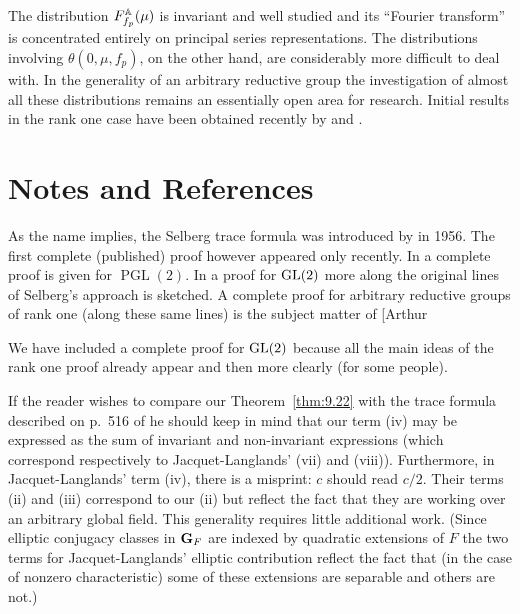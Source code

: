 \begin{remark}
The distribution $F_{f_p}^{\mathbb{A}}(\mu)$ is invariant and well studied and its ``Fourier transform'' is concentrated entirely on principal series representations. The distributions involving $\theta(0, \mu, f_p)$, on the other hand, are considerably more difficult to deal with. In the generality of an arbitrary reductive group the investigation of almost all these distributions remains an essentially open area for research. Initial results in the rank one case have been obtained recently by \cite{SallyWarner} and \cite{Arthur2}.

\end{remark}

\section*{Notes and References}


As the name implies, the Selberg trace formula was introduced by \cite{Selberg} in 1956. The first complete (published) proof however appeared only recently. In \cite{DufloLabesse} a complete proof is given for $\operatorname{PGL}(2)$. In \cite{JacquetLanglands} a proof for $\operatorname{GL}(2)$ more along the original lines of Selberg's approach is sketched. A complete proof for arbitrary reductive groups of rank one (along these same lines) is the subject matter of [Arthur

We have included a complete proof for $\operatorname{GL}(2)$ because all the main ideas of the rank one proof already appear and then more clearly (for some people).

If the reader wishes to compare our Theorem~\ref{thm:9.22} with the trace formula described on p.~516 of \cite{JacquetLanglands} he should keep in mind that our term (iv) may be expressed as the sum of invariant and non-invariant expressions (which correspond respectively to Jacquet-Langlands' (vii) and (viii)). Furthermore, in Jacquet-Langlands' term (iv), there is a misprint: $c$ should read $c/2$. Their terms (ii) and (iii) correspond to our (ii) but reflect the fact that they are working over an arbitrary global field. This generality requires little additional work. (Since elliptic conjugacy classes in $\mathbf{G}_F$ are indexed by quadratic extensions of $F$ the two terms for Jacquet-Langlands' elliptic contribution reflect the fact that (in the case of nonzero characteristic) some of these extensions are separable and others are not.)

